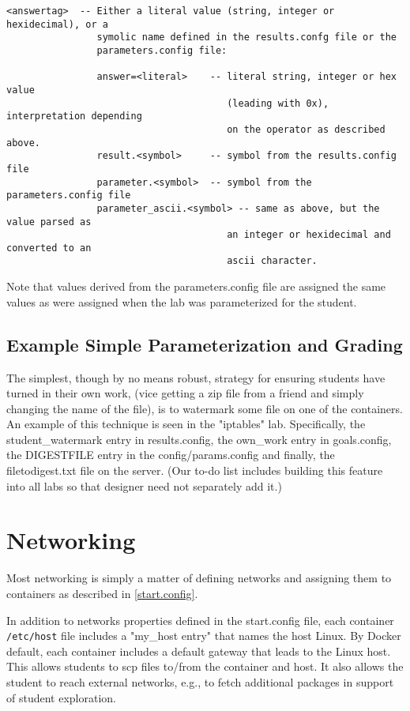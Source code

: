 \documentclass[12pt]{article}
\begin{document}
\begin{verbatim}
<answertag>  -- Either a literal value (string, integer or hexidecimal), or a 
                symolic name defined in the results.confg file or the 
                parameters.config file:
 
                answer=<literal>    -- literal string, integer or hex value 
                                       (leading with 0x), interpretation depending 
                                       on the operator as described above.
                result.<symbol>     -- symbol from the results.config file
                parameter.<symbol>  -- symbol from the parameters.config file
                parameter_ascii.<symbol> -- same as above, but the value parsed as 
                                       an integer or hexidecimal and converted to an 
                                       ascii character.

\end{verbatim}
         Note that values derived from the parameters.config file are assigned the same values as
         were assigned when the lab was parameterized for the student.

\subsection{Example Simple Parameterization and Grading}
The simplest, though by no means robust, strategy for ensuring students
have turned in their own work, (vice getting a zip file from a friend and simply
changing the name of the file), is to watermark some file on one of the containers.
An example of this technique is seen in the "iptables" lab.  Specifically, the
student\_watermark entry in results.config, the own\_work entry in goals.config,
the DIGESTFILE entry in the config/params.config and finally, the filetodigest.txt
file on the server.  (Our to-do list includes building this feature into all labs
so that designer need not separately add it.)

\section{Networking}
Most networking is simply a matter of defining networks and assigning them to containers
as described in \ref{start.config}.  

In addition to networks properties defined in the
start.config file, each container \texttt{/etc/host} file includes a "my\_host entry" that names
the host Linux.  By Docker default, each container includes a default gateway that
leads to the Linux host.  This allows students to scp files to/from the container and host.
It also allows the student to reach external networks, e.g., to fetch additional packages in
support of student exploration.
\end{document}
